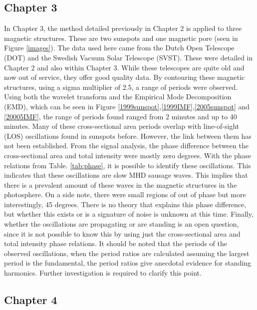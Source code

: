    	\subsection{Chapter 3}
    	
    In Chapter 3, the method detailed previously in Chapter 2 is applied to three magnetic structures.
    These are two sunspots and one magnetic pore (seen in Figure \ref{images}).
    The data used here came from the Dutch Open Telescope (DOT) and the Swedish Vacuum Solar Telescope (SVST). 
    These were detailed in Chapter 2 and also within Chapter 3.
    While these telescopes are quite old and now out of service, they offer good quality data.
    By contouring these magnetic structures, using a sigma multiplier of 2.5, a range of periods were observed.   
    Using both the wavelet transform and the Empirical Mode Decomposition (EMD), which can be seen in Figure \ref{1999sunspot},\ref{1999IMF},\ref{2005sunspot} and \ref{20005IMF}, the range of periods found ranged from 2 minutes and up to 40 minutes. 
    Many of these cross-sectional area periods overlap with line-of-sight (LOS) oscillations found in sunspots before.
    However, the link between them has not been established.
    From the signal analysis, the phase difference between the cross-sectional area and total intensity were mostly zero degrees.
    With the phase relations from Table. \ref{tab:phase}, it is possible to identify these oscillations.
    This indicates that these oscillations are slow MHD sausage waves.
    This implies that there is a prevalent amount of these waves in the magnetic structures in the photosphere.
    On a side note, there were small regions of out of phase but more interestingly, 45 degrees.
    There is no theory that explains this phase difference, but whether this exists or is a signature of noise is unknown at this time.
    Finally, whether the oscillations are propagating or are standing is an open question, since it is not possible to know this by using just the cross-sectional area and total intensity phase relations.    
    It should be noted that the periods of the observed oscillations, when the period ratios are calculated assuming the largest period is the fundamental, the period ratios give anecdotal evidence for standing harmonics.
    Further investigation is required to clarify this point.
    
    \subsection{Chapter 4}
    	
